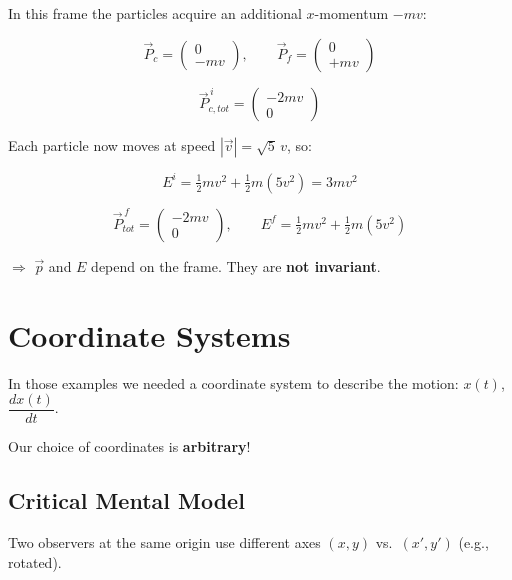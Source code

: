 In this frame the particles acquire an additional $x$-momentum $-mv$:

\[
  \vec{P}_c = \begin{pmatrix} 0 \\ -mv \end{pmatrix}, \qquad
  \vec{P}_f = \begin{pmatrix} 0 \\ +mv \end{pmatrix}
\]

\[
  \vec{P}_{c,tot}^{\,i} = \begin{pmatrix} -2mv \\ 0 \end{pmatrix}
\]

Each particle now moves at speed $|\vec{v}| = \sqrt{5}\,v$, so:

\[
  E^i = \tfrac{1}{2}mv^2 + \tfrac{1}{2}m(5v^2) = 3mv^2
\]

\[
  \vec{P}_{tot}^{\,f} = \begin{pmatrix} -2mv \\ 0 \end{pmatrix}, \qquad
  E^f = \tfrac{1}{2}mv^2 + \tfrac{1}{2}m(5v^2)
\]

$\Rightarrow$ $\vec{p}$ and $E$ depend on the frame.  They are \textbf{not invariant}.

\section*{Coordinate Systems}

In those examples we needed a coordinate system to describe the motion: $x(t)$, $\dfrac{dx(t)}{dt}$.

Our choice of coordinates is \textbf{arbitrary}!

\subsection*{Critical Mental Model}

Two observers at the same origin use different axes $(x,y)$ vs.\ $(x',y')$ (e.g., rotated).

\begin{center}
\end{center}

